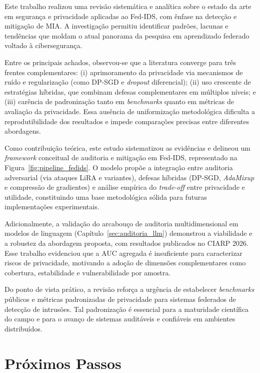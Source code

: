 \documentclass[
	12pt,				%
	openright,			%
	oneside,			%
	a4paper,			%
	english,			%
	french,				%
	spanish,			%
	brazil,				%
	]{abntex2}
\begin{document}
Este trabalho realizou uma revisão sistemática e analítica sobre o estado da arte em segurança e privacidade aplicadas ao Fed-IDS, com ênfase na detecção e mitigação de MIA. A investigação permitiu identificar padrões, lacunas e tendências que moldam o atual panorama da pesquisa em aprendizado federado voltado à cibersegurança.

Entre os principais achados, observou-se que a literatura converge para três frentes complementares: (i) aprimoramento da privacidade via mecanismos de ruído e regularização (como DP-SGD e \textit{dropout} diferencial); (ii) uso crescente de estratégias híbridas, que combinam defesas complementares em múltiplos níveis; e (iii) carência de padronização tanto em \textit{benchmarks} quanto em métricas de avaliação da privacidade. Essa ausência de uniformização metodológica dificulta a reprodutibilidade dos resultados e impede comparações precisas entre diferentes abordagens.

Como contribuição teórica, este estudo sistematizou as evidências e delineou um \textit{framework} conceitual de auditoria e mitigação em Fed-IDS, representado na Figura~\ref{fig:pipeline_fedids}. O modelo propõe a integração entre auditoria adversarial (via ataques LiRA e variantes), defesas híbridas (DP-SGD, \textit{AdaMixup} e compressão de gradientes) e análise empírica do \textit{trade-off} entre privacidade e utilidade, constituindo uma base metodológica sólida para futuras implementações experimentais.

Adicionalmente, a validação do arcabouço de auditoria multidimensional em modelos de linguagem (Capítulo~\ref{sec:auditoria_llm}) demonstrou a viabilidade e a robustez da abordagem proposta, com resultados publicados no CIARP 2026. Esse trabalho evidenciou que a AUC agregada é insuficiente para caracterizar riscos de privacidade, motivando a adoção de dimensões complementares como cobertura, estabilidade e vulnerabilidade por amostra.

Do ponto de vista prático, a revisão reforça a urgência de estabelecer \textit{benchmarks} públicos e métricas padronizadas de privacidade para sistemas federados de detecção de intrusões. Tal padronização é essencial para a maturidade científica do campo e para o avanço de sistemas auditáveis e confiáveis em ambientes distribuídos.

\section{Próximos Passos}
\end{document}
